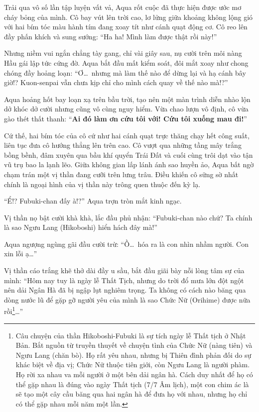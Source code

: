 \documentclass[../main.tex]{subfiles}
\begin{document}
Trải qua vô số lần tập luyện vất vả, Aqua rốt cuộc đã thực hiện được ước mơ cháy bỏng của mình. Cô bay vút lên trời cao, lơ lửng giữa khoảng không lộng gió với hai bím tóc màu hành tím đang xoay tít như cánh quạt động cơ. Cô reo lên đầy phấn khích và sung sướng: ``Ha ha! Mình làm được thật rồi này!''


Nhưng niềm vui ngắn chẳng tày gang, chỉ vài giây sau, nụ cười trên môi nàng Hầu gái lập tức cứng đờ. Aqua bắt đầu mất kiểm soát, đôi mắt xoay như chong chóng đầy hoảng loạn: ``Ơ\dots\ nhưng mà làm thế nào để dừng lại và hạ cánh bây giờ!? Kuon-senpai vẫn chưa kịp chỉ cho mình cách quay về thế nào mà!?''

Aqua hoảng hốt bay loạn xạ trên bầu trời, tạo nên một màn trình diễn nhào lộn dở khóc dở cười nhưng cũng vô cùng nguy hiểm. Vừa chao lượn vô định, cô vừa gào thét thất thanh: ``\textbf{Ai đó làm ơn cứu tôi với! Cứu tôi xuống mau đi!}''

Cứ thế, hai bím tóc của cô cứ như hai cánh quạt trực thăng chạy hết công suất, liên tục đưa cô hướng thẳng lên trên cao. Cô vượt qua những tầng mây trắng bồng bềnh, đâm xuyên qua bầu khí quyển Trái Đất và cuối cùng trôi dạt vào tận vũ trụ bao la lạnh lẽo. Giữa không gian lấp lánh ánh sao huyền ảo, Aqua bất ngờ chạm trán một vị thần đang cưỡi trên lưng trâu. Điều khiến cô sững sờ nhất chính là ngoại hình của vị thần này trông quen thuộc đến kỳ lạ.


``Ể!? Fubuki-chan đấy à!?'' Aqua trợn tròn mắt kinh ngạc.

Vị thần nọ bật cười khà khà, lắc đầu phủ nhận: ``Fubuki-chan nào chứ? Ta chính là sao Ngưu Lang (Hikoboshi) hiển hách đây mà!''

Aqua ngượng ngùng gãi đầu cười trừ: ``Ồ\dots\ hóa ra là con nhìn nhầm người. Con xin lỗi ạ\dots''

Vị thần cáo trắng khẽ thở dài đầy u sầu, bắt đầu giãi bày nỗi lòng tâm sự của mình: ``Hôm nay tuy là ngày lễ Thất Tịch, nhưng do trời đổ mưa lớn đột ngột nên dải Ngân Hà đã bị ngập lụt nghiêm trọng. Ta không có cách nào băng qua dòng nước lũ để gặp gỡ người yêu của mình là sao Chức Nữ (Orihime) được nữa rồi\footnote{Câu chuyện của thần Hikoboshi-Fubuki là sự tích ngày lễ Thất tịch ở Nhật Bản. Bắt nguồn từ truyền thuyết về chuyện tình của Chức Nữ (nàng tiên) và Ngưu Lang (chăn bò). Họ rất yêu nhau, nhưng bị Thiên đình phản đối do sự khác biệt về địa vị; Chức Nữ thuộc tiên giới, còn Ngưu Lang là người phàm. Họ rời xa nhau va mỗi người ở một bên dải ngân hà. Cách duy nhất để họ có thể gặp nhau là đúng vào ngày Thất tịch (7/7 Âm lịch), một con chim ác là sẽ tạo một cây cầu băng qua hai ngân hà để đưa họ với nhau, nhưng họ chỉ có thể gặp nhau mỗi năm một lần.}\dots''
\end{document}

